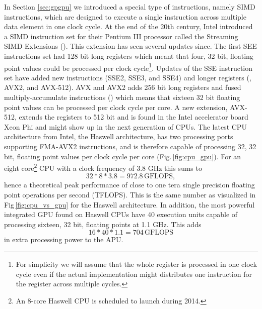 In Section \ref{sec:gpgpu} we introduced a special type of instructions, namely SIMD instructions, which are designed to execute a single instruction across multiple data element in one clock cycle. At the end of the 20th century, Intel introduced a SIMD instruction set for their Pentium III processor called the Streaming SIMD Extensions (). This extension has seen several updates since. The first SEE instructions set had 128 bit long registers which meant that four, 32 bit, floating point values could be processed per clock cycle\footnote{For simplicity we will assume that the whole register is processed in one clock cycle even if the actual implementation might distributes one instruction for the register across multiple cycles.}. Updates of the SSE instruction set have added new instructions (SSE2, SSE3, and SSE4) and longer registers (, AVX2, and AVX-512). AVX and AVX2 adds 256 bit long registers and fused multiply-accumulate instructions ()  which means that sixteen 32 bit floating point values can be processed per clock cycle per core. A new extension, AVX-512, extends the registers to 512 bit and is found in the Intel accelerator board  Xeon Phi and might show up in the next generation of CPUs. The latest CPU architecture from Intel, the Haswell architecture, has two processing ports supporting FMA-AVX2 instructions, and is therefore capable of processing 32, 32 bit, floating point values per clock cycle per core (Fig.\,\ref{fig:cpu_gpu}). For an eight core\footnote{An 8-core Haswell CPU is scheduled to launch during 2014.} CPU with a clock frequency of 3.8 GHz this sums to 
\begin{equation}
32*8*3.8 = 972.8\,\text{GFLOPS},
\end{equation}
hence a theoretical peak performance of close to one tera single precision floating point operations per second (TFLOPS). This is the same number as visualized in Fig\,\ref{fig:cpu_vs_gpu} for the Haswell architecture. In addition, the most powerful integrated GPU found on Haswell CPUs have 40 execution units capable of processing sixteen, 32 bit, floating points at 1.1 GHz. This adds
\begin{equation}
16*40*1.1 = 704\,\text{GFLOPS}
\end{equation}
in extra processing power to the APU.

